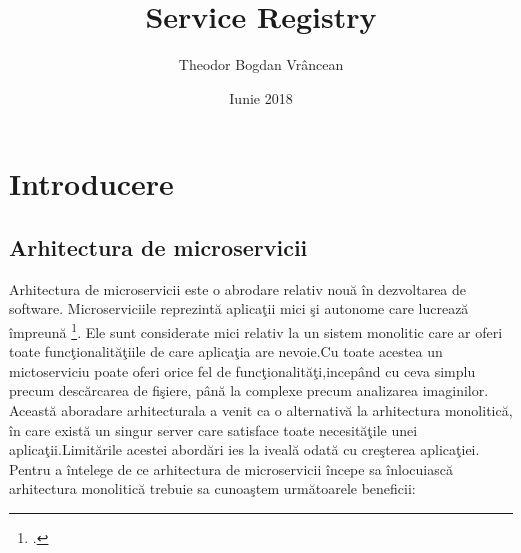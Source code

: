 \documentclass[a4paper,12pt]{report}
\title{Service Registry}
\author{Theodor Bogdan Vr\^ancean}
\date {Iunie 2018}
\begin{document}
\maketitle
\tableofcontents
\chapter{Introducere}
\section{Arhitectura de microservicii}

Arhitectura de microservicii este o abrodare relativ nou\u a \^ in dezvoltarea de software.
Microserviciile reprezint\u a aplica\c tii mici \c si autonome care lucreaz\u a \^ impreun\u a
\footcite{buildingMicroservices1}. Ele sunt considerate mici relativ la un sistem monolitic care ar
oferi toate func\c tionalit\u a\c tiile de care aplica\c tia are nevoie.Cu toate acestea un mictoserviciu poate oferi orice
fel de func\c tionalit\u a\c ti,incep\^and cu ceva simplu precum desc\u arcarea de fi\c siere, p\^an\u a la
complexe precum analizarea imaginilor.
Aceast\u a aboradare arhitecturala a venit ca o alternativ\u a la arhitectura monolitic\u a, \^in care exist\u a
un singur server care satisface toate necesit\u a\c tile unei aplica\c tii.Limit\u arile acestei abord\u ari ies la iveal\u a
odat\u a cu cre\c sterea aplica\c tiei.
Pentru a \^intelege de ce arhitectura  de microservicii \^incepe sa \^inlocuiasc\u a arhitectura monolitic\u a
trebuie sa cunoa\c stem urm\u atoarele beneficii:
\end{document}
